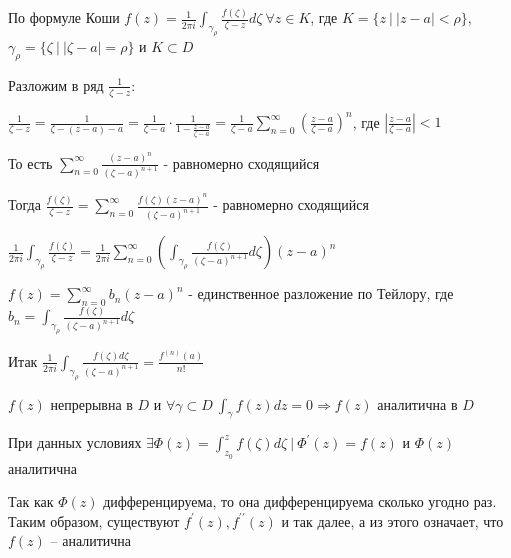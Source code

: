 \documentclass[12pt]{article}
\begin{document}
\begin{MyProof}
    По формуле Коши $f(z) = \frac{1}{2\pi i} \int_{\gamma_\rho} \frac{f(\zeta)}{\zeta - z} d\zeta \ \forall z \in K$, где $K = \{z \ | \ |z - a| < \rho\}$, $\gamma_\rho = \{ \zeta \ | \ |\zeta - a| = \rho\}$ и $K \subset D$

    Разложим в ряд $\frac{1}{\zeta - z}$:

    $\frac{1}{\zeta - z} = \frac{1}{\zeta - (z - a) - a} = \frac{1}{\zeta - a} \cdot \frac{1}{1 - \frac{z - a}{\zeta - a}} = \frac{1}{\zeta - a} \sum_{n = 0}^\infty \left(\frac{z - a}{\zeta - a}\right)^n$, где $\left|\frac{z - a}{\zeta - a}\right| < 1$

    То есть $\sum_{n = 0}^\infty \frac{(z - a)^n}{(\zeta - a)^{n + 1}}$ - равномерно сходящийся

    Тогда $\frac{f(\zeta)}{\zeta - z} = \sum_{n = 0}^\infty \frac{f(\zeta) (z - a)^n}{(\zeta - a)^{n + 1}}$ - равномерно сходящийся 

    $\frac{1}{2\pi i} \int_{\gamma_\rho} \frac{f(\zeta)}{\zeta - z} = \frac{1}{2\pi i} \sum_{n = 0}^\infty \left(\int_{\gamma_\rho} \frac{f(\zeta)}{(\zeta - a)^{n + 1}} d\zeta \right) (z - a)^n$

    $f(z) = \sum_{n = 0}^\infty b_n (z - a)^n$ - единственное разложение по Тейлору, где $b_n = \int_{\gamma_\rho} \frac{f(\zeta)}{(\zeta - a)^{n + 1}} d\zeta$

    Итак $\frac{1}{2\pi i} \int_{\gamma_\rho} \frac{f(\zeta) d\zeta}{(\zeta - a)^{n + 1}} = \frac{f^{(n)}(a)}{n!}$
\end{MyProof}






\begin{MyTheorem}
     $f(z)$ непрерывна в $D$ и $\forall \gamma \subset D \ \int_\gamma f(z) dz = 0 \Longrightarrow f(z)$ аналитична в $D$
\end{MyTheorem}

\begin{MyProof}
    При данных условиях $\exists \Phi(z) = \int_{z_0}^z f(\zeta) d\zeta \ | \ \Phi^\prime(z) = f(z)$ и $\Phi(z)$ аналитична

    Так как $\Phi(z)$ дифференцируема, то она дифференцируема сколько угодно раз. Таким образом, существуют $f^\prime(z), f^{\prime\prime}(z)$ и так далее, а из этого означает, что $f(z)$ -- аналитична
\end{MyProof}
\end{document}
